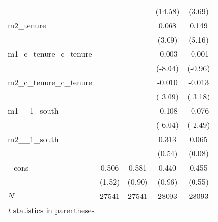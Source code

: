 \begin{tabular}{l*{4}{c}}
            &            &            &     (14.58)&      (3.69)\\
m2\_tenure   &            &            &       0.068&       0.149\\
            &            &            &      (3.09)&      (5.16)\\
m1\_c\_tenure\_c\_tenure&            &            &      -0.003&      -0.001\\
            &            &            &     (-8.04)&     (-0.96)\\
m2\_c\_tenure\_c\_tenure&            &            &      -0.010&      -0.013\\
            &            &            &     (-3.09)&     (-3.18)\\
m1\_\_1\_south &            &            &      -0.108&      -0.076\\
            &            &            &     (-6.04)&     (-2.49)\\
m2\_\_1\_south &            &            &       0.313&       0.065\\
            &            &            &      (0.54)&      (0.08)\\
\_cons      &       0.506&       0.581&       0.440&       0.455\\
            &      (1.52)&      (0.90)&      (0.96)&      (0.55)\\
\hline
\(N\)       &       27541&       27541&       28093&       28093\\
\hline\hline
\multicolumn{5}{l}{\footnotesize \textit{t} statistics in parentheses}\\
\end{tabular}
